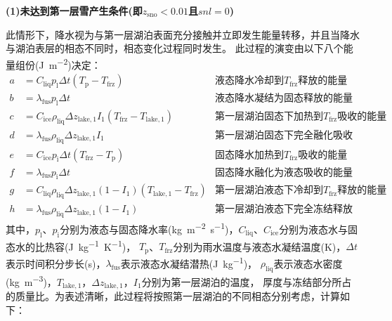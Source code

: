 \noindent\textbf {(1)未达到第一层雪产生条件(即$z_{\mathrm{sno}}<0.01$且$snl=0$)}

此情形下，降水视为与第一层湖泊表面充分接触并立即发生能量转移，并且当降水与湖泊表层的相态不同时，相态变化过程同时发生。
此过程的演变由以下八个能量组份(\unit{J.m^{-2}})决定：
\begin{align*}
  a &= C_{\mathrm{liq}} p_{\mathrm{l}} \Delta t\left(T_{\mathrm{p}}-T_{\mathrm {frz}}\right)   & \text{液态降水冷却到$T_{\mathrm {frz}} $释放的能量} \\
  b &= \lambda_{\mathrm {fus}}  p_{\mathrm {l}}  \Delta t                                           & \text{液态降水凝结为固态释放的能量} \\
  c &= C_{\mathrm{ice}} \rho_{\mathrm{liq}} \Delta z_{\mathrm{lake, 1}} I_{1}\left(T_{\mathrm {frz}} -T_{\mathrm{lake, 1}}\right)  & \text{第一层湖泊固态下加热到$T_{\mathrm {frz}} $吸收的能量} \\
  d &= \lambda_{\mathrm {fus}}  \rho_{\mathrm{liq}} \Delta z_{\mathrm{lake, 1}} I_{1}         & \text{第一层湖泊固态下完全融化吸收的能量} \\
  e &= C_{\mathrm{ice}} p_{\mathrm {i}}  \Delta t\left(T_{\mathrm {frz}}  -T_{\mathrm {p}} \right)        & \text{固态降水加热到$T_{\mathrm {frz}} $吸收的能量} \\
  f &= \lambda_{\mathrm {fus}}  p_{\mathrm {i}}  \Delta t                                           & \text{固态降水融化为液态吸收的能量} \\
  g &= C_{\mathrm{liq}} \rho_{\mathrm{liq}} \Delta z_{\mathrm{lake, 1}}\left(1-I_{1}\right)\left(T_{\mathrm{lake, 1}}-T_{\mathrm {frz}} \right)  & \text{第一层湖泊液态下冷却到$T_{\mathrm {frz}} $释放的能量} \\
  h &= \lambda_{\mathrm {fus}}  \rho_{\mathrm{liq}} \Delta z_{\mathrm{lake, 1}}\left(1-I_{1}\right)  & \text{第一层湖泊液态下完全冻结释放的能量}
\end{align*}
其中，$p_{\mathrm {l}} $、$p_{\mathrm {i}} $分别为液态与固态降水率(\unit{kg.m^{-2}.s^{-1}})，$C_{\mathrm{liq}}$、$C_{\mathrm{ice}}$分别为液态水与固态水的比热容(\unit{J.kg^{-1}.K^{-1}})，
$T_{\mathrm {p}} $、$T_{\mathrm {frz}} $分别为雨水温度与液态水凝结温度(K)，$\Delta t$表示时间积分步长(s)，$\lambda_{\mathrm {fus}} $表示液态水凝结潜热(\unit{J.kg^{-1}})，
$\rho_{\mathrm{liq}}$表示液态水密度(\unit{kg.m^{-3}})，$T_{\mathrm{lake,1}}$，$\Delta z_{\mathrm{lake,1}}$，$I_1$分别为第一层湖泊的温度，
厚度与冻结部分所占的质量比。为表述清晰，此过程将按照第一层湖泊的不同相态分别考虑，计算如下：

